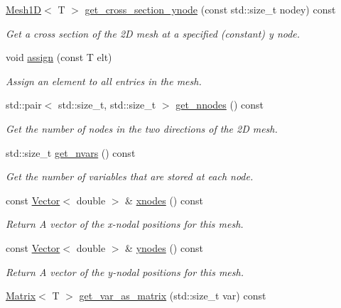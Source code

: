 \begin{DoxyCompactItemize}
\hyperlink{classLuna_1_1Mesh1D}{Mesh1D}$<$ T $>$ \hyperlink{classLuna_1_1Mesh2D_ad73c523ff66dc2d481370cd774c8e7e4}{get\+\_\+cross\+\_\+section\+\_\+ynode} (const std\+::size\+\_\+t nodey) const
\begin{DoxyCompactList}\small\item\em Get a cross section of the 2D mesh at a specified (constant) y node. \end{DoxyCompactList}\item 
void \hyperlink{classLuna_1_1Mesh2D_a4f0219cbe058c1610af4b358c384f3d2}{assign} (const T elt)
\begin{DoxyCompactList}\small\item\em Assign an element to all entries in the mesh. \end{DoxyCompactList}\item 
std\+::pair$<$ std\+::size\+\_\+t, std\+::size\+\_\+t $>$ \hyperlink{classLuna_1_1Mesh2D_a8e154c77471f89bc056b2950b26f1d80}{get\+\_\+nnodes} () const
\begin{DoxyCompactList}\small\item\em Get the number of nodes in the two directions of the 2D mesh. \end{DoxyCompactList}\item 
std\+::size\+\_\+t \hyperlink{classLuna_1_1Mesh2D_a4ba86ff35a1f11cd245505cc6eea013e}{get\+\_\+nvars} () const
\begin{DoxyCompactList}\small\item\em Get the number of variables that are stored at each node. \end{DoxyCompactList}\item 
const \hyperlink{classLuna_1_1Vector}{Vector}$<$ double $>$ \& \hyperlink{classLuna_1_1Mesh2D_a8a860fec0e116f915dcac68476d9e7d8}{xnodes} () const
\begin{DoxyCompactList}\small\item\em Return A vector of the x-\/nodal positions for this mesh. \end{DoxyCompactList}\item 
const \hyperlink{classLuna_1_1Vector}{Vector}$<$ double $>$ \& \hyperlink{classLuna_1_1Mesh2D_a7644446cbd5b3f1dc40f1fd8f9137ff3}{ynodes} () const
\begin{DoxyCompactList}\small\item\em Return A vector of the y-\/nodal positions for this mesh. \end{DoxyCompactList}\item 
\hyperlink{classLuna_1_1Matrix}{Matrix}$<$ T $>$ \hyperlink{classLuna_1_1Mesh2D_a5a1fead4879bad7bd798cac3bfd10e85}{get\+\_\+var\+\_\+as\+\_\+matrix} (std\+::size\+\_\+t var) const

\end{DoxyCompactItemize}
